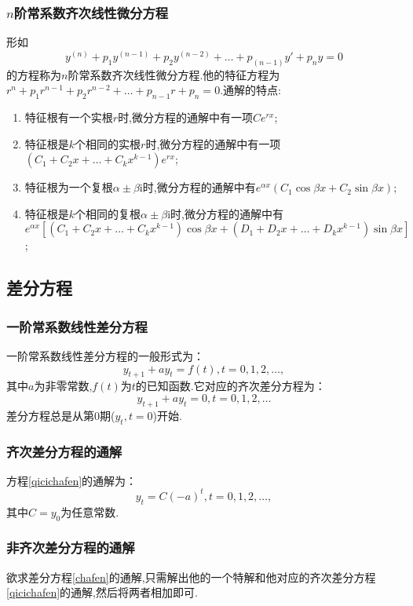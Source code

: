 \subsubsection{$n$阶常系数齐次线性微分方程}
形如
\begin{equation*}
    y^{(n)}+p_1y^{(n-1)}+p_2y^{(n-2)}+\dots +p_{(n-1)}y'+p_ny=0
\end{equation*}
的方程称为$n$阶常系数齐次线性微分方程.他的特征方程为$r^{n}+p_1r^{n-1}+p_2r^{n-2}+\dots +p_{n-1}r+p_n=0$.通解的特点:
\begin{enumerate}
    \item 特征根有一个实根$r$时,微分方程的通解中有一项$Ce^{rx}$;
    \item 特征根是$k$个相同的实根$r$时,微分方程的通解中有一项$(C_1+C_2x+\dots+C_kx^{k-1})e^{rx}$;
    \item 特征根为一个复根$\alpha \pm \beta \mathrm{i} $时,微分方程的通解中有$e^{\alpha x}(C_1\cos \beta x+C_2\sin \beta x)$;
    \item 特征根是$k$个相同的复根$\alpha \pm \beta \mathrm{i} $时,微分方程的通解中有$e^{\alpha x}[(C_1+C_2x+\dots+C_kx^{k-1})\cos \beta x+(D_1+D_2x+\dots+D_kx^{k-1})\sin \beta x]$;
\end{enumerate}

\subsection{差分方程}
\subsubsection{一阶常系数线性差分方程}
一阶常系数线性差分方程的一般形式为：
\begin{equation}
    \label{chafen}
    y_{t+1}+ay_t=f(t),t=0,1,2,\dots,
\end{equation}
其中$a$为非零常数,$f(t)$为$t$的已知函数.它对应的齐次差分方程为：
\begin{equation}
    \label{qicichafen}
    y_{t+1}+ay_t=0,t=0,1,2,\dots
\end{equation}
差分方程总是从第0期($y_t,t=0$)开始.

\subsubsection{齐次差分方程的通解}
方程\ref{qicichafen}的通解为：
\begin{equation*}
    y_t=C(-a)^t,t=0,1,2,\dots,
\end{equation*}
其中$C=y_0$为任意常数.
\subsubsection{非齐次差分方程的通解}
欲求差分方程\ref{chafen}的通解,只需解出他的一个特解和他对应的齐次差分方程\ref{qicichafen}的通解,然后将两者相加即可.

